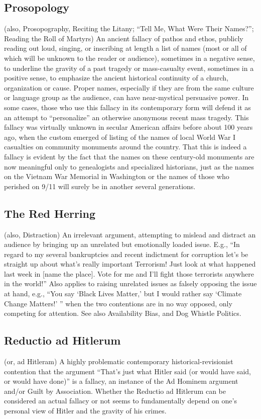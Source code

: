 \documentclass[10pt,a4paper,british]{article}
\begin{document}
\begin{multicols}{2}
	\subsection{Prosopology} (also, Prosopography, Reciting the Litany; ``Tell Me, What Were Their Names?''; Reading the Roll of Martyrs) An ancient fallacy of pathos and ethos, publicly reading out loud, singing, or inscribing at length a list of names (most or all of which will be unknown to the reader or audience), sometimes in a negative sense, to underline the gravity of a past tragedy or mass{-}casualty event, sometimes in a positive sense, to emphasize the ancient historical continuity of a church, organization or cause. Proper names, especially if they are from the same culture or language group as the audience, can have near{-}mystical persuasive power.  In some cases, those who use this fallacy in its contemporary form will defend it as an attempt to ``personalize'' an otherwise anonymous recent mass tragedy. This fallacy was virtually unknown in secular American affairs before about 100 years ago, when the custom emerged of listing of the names of local World War I casualties on community monuments around the country. That this is indeed a fallacy is evident by the fact that the names on these century{-}old monuments are now meaningful only to genealogists and specialized historians, just as the names on the Vietnam War Memorial in Washington or the names of those who perished on 9/11 will surely be in another several generations.  

	\subsection{The Red Herring} (also, Distraction) An irrelevant argument, attempting to mislead and distract an audience by bringing up an unrelated but emotionally loaded issue. E.g., ``In regard to my several bankruptcies and recent indictment for corruption let’s be straight up about what’s really important Terrorism!  Just look at what happened last week in [name the place]. Vote for me and I'll fight those terrorists anywhere in the world!''  Also applies to raising unrelated issues as falsely opposing the issue at hand, e.g., ``You say `Black Lives Matter,' but I would rather say `Climate Change Matters!' '' when the two contentions are in no way opposed, only competing for attention. See also Availability Bias, and Dog Whistle Politics.  

	\subsection{Reductio ad Hitlerum} (or, ad Hitleram) A highly problematic contemporary historical{-}revisionist contention that the argument ``That's just what Hitler said (or would have said, or would have done)'' is a fallacy, an instance of the Ad Hominem argument and/or Guilt by Association. Whether the Reductio ad Hitlerum can be considered an actual fallacy or not seems to fundamentally depend on one's personal view of Hitler and the gravity of his crimes.  


\end{multicols}
\end{document}
